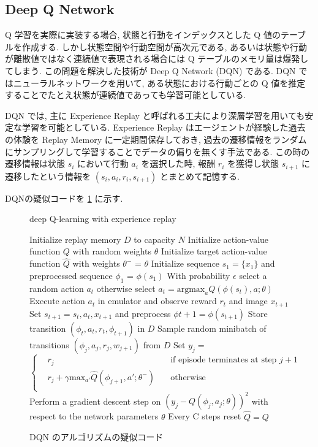 \documentclass[12pt]{jarticle}
\begin{document}
\subsection{Deep Q Network}
Q 学習を実際に実装する場合, 状態と行動をインデックスとした Q 値のテーブルを作成する. しかし状態空間や行動空間が高次元である, あるいは状態や行動が離散値ではなく連続値で表現される場合には Q テーブルのメモリ量は爆発してしまう. この問題を解決した技術が Deep Q Network (DQN) \cite{DQN} である.
 DQN ではニューラルネットワークを用いて, ある状態における行動ごとの Q 値を推定することでたとえ状態が連続値であっても学習可能としている.
 \par
 DQN では, 主に Experience Replay と呼ばれる工夫により深層学習を用いても安定な学習を可能としている. 
 Experience Replay はエージェントが経験した過去の体験を Replay Memory に一定期間保存しておき, 過去の遷移情報をランダムにサンプリングして学習することでデータの偏りを無くす手法である. この時の遷移情報は状態 $s_i$ において行動 $a_i$ を選択した時, 報酬 $r_i$ を獲得し状態 $s_{i+1}$ に遷移したという情報を $(s_i, a_i, r_i, s_{i+1})$ とまとめて記憶する. \par
 DQNの疑似コードを \ref{alg:DQN} に示す.
 \begin{figure}[H]
  \begin{algorithm}[H]
      \caption{
        deep Q-learning with experience replay
        }
      \begin{algorithmic}[1] 
      \STATE Initialize replay memory $D$ to capacity $N$
      \STATE Initialize action-value function $Q$ with random weights $\theta$
      \STATE Initialize target action-value function $\hat{Q}$ with weights $\theta^{-}$ = $\theta$
      \STATE Initialize sequence $s_{1} = \{x_1\}$ and preprocessed sequence $\phi_1$ = $\phi(s_1)$ 
      \STATE With probability $\epsilon$ select a random action $a_{t}$
      \STATE otherwise select $a_t = \mathrm{argmax}_{a}Q(\phi(s_{t}),a; \theta)$
      \STATE Execute action $a_t$ in emulator and observe reward $r_t$ and image $x_{t+1}$
      \STATE Set $s_{t+1} = s_t,a_t,x_{t+1}$ and preprocess $\phi{t+1} = \phi(s_{t+1}) $
      \STATE Store transition $(\phi_t,a_t,r_t,\phi_{t+1})$ in $D$
      \STATE Sample random minibatch of transitions $(\phi_j,a_j,r_j,w_{j+1})$ from $D$
      \STATE Set $y_j = $ $\left\{
        \begin{aligned}
            &r_j \quad & \text{if episode terminates at step } j + 1 \\
            &r_j + \gamma \mathrm{max}_{a'} \hat{Q}(\phi_{j+1},a';\theta^{-}) \quad  & \text{otherwise}\\
        \end{aligned}
      \right.     $   
      \STATE Perform a gradient descent step on $(y_j - Q(\phi_j,a_j;\theta))^2$ with respect to the network parameters $\theta$
      \STATE Every C steps reset $\hat{Q} = Q$
        
      \ENDFOR
      \ENDFOR
      \end{algorithmic}
  \end{algorithm}
  \caption{DQN のアルゴリズムの疑似コード \cite{DQN_algorithm}}
  \label{alg:DQN}
  \end{figure}
\end{document}

